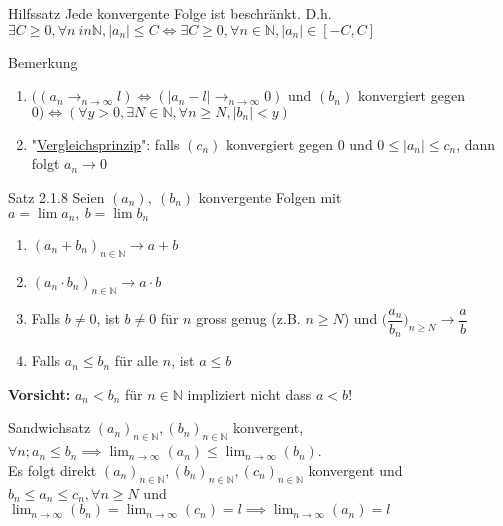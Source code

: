 \documentclass[a4paper,10pt]{article}
\begin{document}
\begin{tbox} {Hilfssatz}
Jede konvergente Folge ist beschränkt. D.h. $\exists C \ge 0, \forall n \ in \mathbb{N}, |a_n|\le C\iff \exists C \ge 0, \forall n \in \mathbb{N}, |a_n|\in [-C,C]$
\end{tbox}
\begin{bembox}{Bemerkung}
    \begin{enumerate}
        \item $\big((a_n\longrightarrow_{n\to\infty} l) \iff (|a_n-l|\longrightarrow_{n\to\infty} 0)$ und $(b_n)$ konvergiert gegen $0\big)\iff (\forall y > 0, \exists N \in \mathbb{N}, \forall n\ge N, |b_n|<y)$
        \item "\underline{Vergleichsprinzip}": falls $(c_n)$ konvergiert gegen $0$ und $0\le |a_n| \le c_n$, dann folgt $a_n\longrightarrow 0$
    \end{enumerate}
\end{bembox}
\begin{tbox}{Satz 2.1.8}
    Seien $(a_n), \ (b_n) $ konvergente Folgen mit \\$a=\lim a_n, \ b= \lim b_n$
     \begin{enumerate}
         \item $(a_n+b_n)_{n\in\mathbb{N}} \longrightarrow a+b$ 
         \item $(a_n\cdot b_n)_{n\in \mathbb N} \longrightarrow a\cdot b$ 
         \item Falls $b\neq 0$, ist $b\neq 0$ für $n$ gross genug (z.B. $n\ge N$) und $\bigg(\dfrac {a_n} {b_n}\bigg)_{n\ge N}\longrightarrow \dfrac a b $
         \item Falls $a_n\le b_n$ für alle $n$, ist $a\le b$
     \end{enumerate}
\end{tbox}
\begin{flushleft}
\textbf{Vorsicht: } $a_n<b_n$ für $n\in \mathbb N$ impliziert nicht dass $a<b$!
\end{flushleft}

\begin{tbox}{Sandwichsatz}
$(a_n)_{n\in\mathbb N}, (b_n)_{n\in\mathbb N}$ konvergent, $\forall n; a_n\le b_n \implies \lim_{n\to\infty} (a_n)\le \lim_{n\to\infty}(b_n)$. \\Es folgt direkt $(a_n)_{n\in\mathbb{N}},(b_n)_{n\in\mathbb{N}}, (c_n)_{n\in\mathbb{N}}$ konvergent und $b_n\le a_n \le c_n, \forall n \ge N$ und $\lim_{n\to\infty}(b_n)=\lim_{n\to\infty}(c_n)=l\implies \lim_{n\to\infty}(a_n)=l$
    
\end{tbox}
\end{document}
